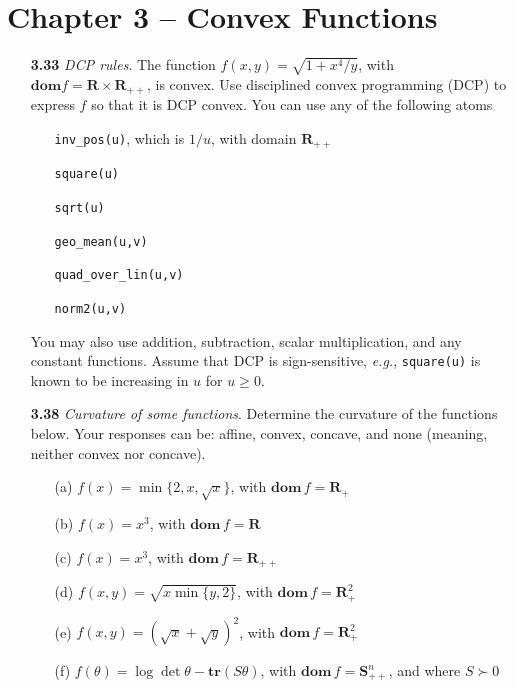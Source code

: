 \documentclass[11pt,a4paper]{article}
\begin{document}
\section*{Chapter 3 -- Convex Functions}

\begin{itemize}
    \item[\textbf{3.33}] \textit{DCP rules}. The function $f(x,y) = \sqrt{1 + x^4/y}$, with $\textbf{dom} f = \mathbf{R}\times\mathbf{R}_{++}$, is convex. Use disciplined convex programming (DCP) to express $f$ so that it is DCP convex. You can use any of the following atoms
    \item[]\begin{itemize}
        \item[] \texttt{inv\_pos(u)}, which is $1/u$, with domain $\mathbf{R}_{++}$
        \item[] \texttt{square(u)}
        \item[] \texttt{sqrt(u)}
        \item[] \texttt{geo\_mean(u,v)}
        \item[] \texttt{quad\_over\_lin(u,v)}
        \item[] \texttt{norm2(u,v)}
    \end{itemize}

    You may also use addition, subtraction, scalar multiplication, and any constant functions. Assume that DCP is sign-sensitive, \textit{e.g.}, \texttt{square(u)} is known to be increasing in $u$ for $u \geq 0$.

    \item[\textbf{3.38}] \textit{Curvature of some functions}. Determine the curvature of the functions below. Your responses can be: affine, convex, concave, and none (meaning, neither convex nor concave).
    \item[] \begin{itemize}
        \item[(a)] $f(x) = \min\{2,x,\sqrt{x}\}$, with $\textbf{dom}\, f = \mathbf{R}_+$
        \item[(b)] $f(x) = x^3$, with $\textbf{dom} \, f = \mathbf{R}$
        \item[(c)] $f(x) = x^3$, with $\textbf{dom} \, f = \mathbf{R}_{++}$
        \item[(d)] $f(x,y) = \sqrt{x \min\{y,2\}}$, with $\mathbf{dom} \, f = \mathbf{R}_+^2$
        \item[(e)] $f(x,y) = (\sqrt{x} + \sqrt{y})^2$, with $\textbf{dom} \, f = \mathbf{R}_+^2$
        \item[(f)] $f(\theta) = \log \det \theta - \textbf{tr}(S\theta)$, with $\textbf{dom} \, f = \mathbf{S}_{++}^n$, and where $S \succ 0$
    \end{itemize}


\end{itemize}
\end{document}
